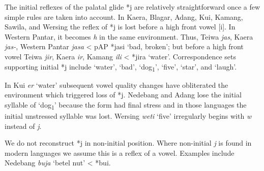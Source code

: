The initial reflexes of the palatal glide *j are relatively straightforward once a few simple rules are taken into account. In Kaera, Blagar, Adang, Kui, Kamang, Sawila, and Wersing the reflex of *j is lost before a high front vowel [i]. In Western Pantar, it becomes \textit{h} in the same environment. Thus, Teiwa \textit{jas}, Kaera \textit{jas-}, Western Pantar \textit{jasa} {\textless} pAP *jasi {\textquoteleft}bad, broken{\textquoteright}; but before a high front vowel Teiwa \textit{jir}, Kaera \textit{ir}, Kamang \textit{ili }{\textless} *jira {\textquoteleft}water{\textquoteright}. Correspondence sets supporting initial *j include {\textquoteleft}water{\textquoteright}, {\textquoteleft}bad{\textquoteright}, {\textquoteleft}dog\textsubscript{1}{\textquoteright}, {\textquoteleft}five{\textquoteright}, {\textquoteleft}star{\textquoteright}, and {\textquoteleft}laugh{\textquoteright}. 

In Kui \textit{e{\textlengthmark}r }{\textquoteleft}water{\textquoteright} subsequent vowel quality changes have obliterated the environment which triggered loss of *j. Nedebang and Adang lose the initial syllable of {\textquoteleft}dog\textsubscript{1}{\textquoteright} because the form had final stress and in those languages the initial unstressed syllable was lost. Wersing \textit{weti{\ng}} {\textquoteleft}five{\textquoteright} irregularly begins with \textit{w} instead of \textit{j}. 

We do not reconstruct *j in non-initial position. Where non-initial \textit{j }is found in modern languages we assume this is a reflex of a vowel. Examples include Nedebang \textit{buja} {\textquoteleft}betel nut{\textquoteright} {\textless} *bui. 

